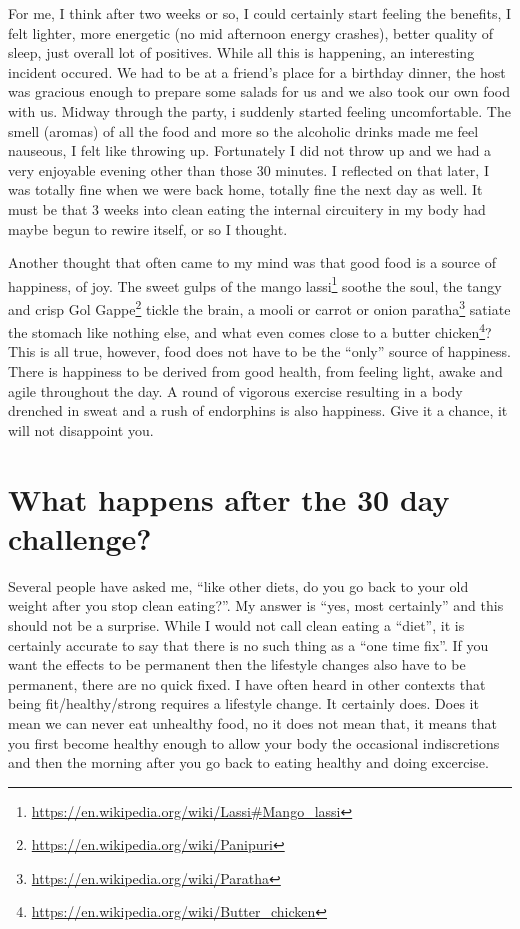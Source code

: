 \documentclass[oneside]{book}
\renewcommand{\href}[2]{#2\footnote{\url{#1}}}
\begin{document}
For me, I think after two weeks or so, I could certainly start feeling
the benefits, I felt lighter, more energetic (no mid afternoon energy
crashes), better quality of sleep, just overall lot of positives. While
all this is happening, an interesting incident occured. We had to be at
a friend's place for a birthday dinner, the host was gracious enough to
prepare some salads for us and we also took our own food with us. Midway
through the party, i suddenly started feeling uncomfortable. The smell
(aromas) of all the food and more so the alcoholic drinks made me feel
nauseous, I felt like throwing up. Fortunately I did not throw up and we
had a very enjoyable evening other than those 30 minutes. I reflected on
that later, I was totally fine when we were back home, totally fine the
next day as well. It must be that 3 weeks into clean eating the internal
circuitery in my body had maybe begun to rewire itself, or so I thought.

Another thought that often came to my mind was that good food is a
source of happiness, of joy. The sweet gulps of the
\href{https://en.wikipedia.org/wiki/Lassi\#Mango_lassi}{mango lassi}
soothe the soul, the tangy and crisp
\href{https://en.wikipedia.org/wiki/Panipuri}{Gol Gappe} tickle the
brain, a \href{https://en.wikipedia.org/wiki/Paratha}{mooli or carrot or
onion paratha} satiate the stomach like nothing else, and what even
comes close to a
\href{https://en.wikipedia.org/wiki/Butter_chicken}{butter chicken}?
This is all true, however, food does not have to be the ``only'' source
of happiness. There is happiness to be derived from good health, from
feeling light, awake and agile throughout the day. A round of vigorous
exercise resulting in a body drenched in sweat and a rush of endorphins
is also happiness. Give it a chance, it will not disappoint you.

\section{What happens after the 30 day
challenge?}\label{what-happens-after-the-30-day-challenge}

Several people have asked me, ``like other diets, do you go back to your
old weight after you stop clean eating?''. My answer is ``yes, most
certainly'' and this should not be a surprise. While I would not call
clean eating a ``diet'', it is certainly accurate to say that there is
no such thing as a ``one time fix''. If you want the effects to be
permanent then the lifestyle changes also have to be permanent, there
are no quick fixed. I have often heard in other contexts that being
fit/healthy/strong requires a lifestyle change. It certainly does. Does
it mean we can never eat unhealthy food, no it does not mean that, it
means that you first become healthy enough to allow your body the
occasional indiscretions and then the morning after you go back to
eating healthy and doing excercise.
\end{document}
